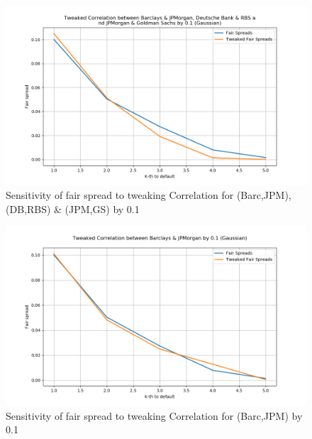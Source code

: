 \documentclass{report}
\theoremstyle{plain}
\theoremstyle{definition}
\begin{document}
\begin{figure}[H]
	\begin{center}
		\includegraphics[width=15cm]{Tweaked_Correlation_between_Barclays_&_JPMorgan,_Deutsche_Bank_&_RBS_and_JPMorgan_&_Goldman_Sachs_by_0,1_(Gaussian).png}
		\caption{Sensitivity of fair spread to tweaking Correlation for (Barc,JPM), (DB,RBS) \& (JPM,GS) by 0.1} 
		\label{Tweaked_Correlation_between_Barclays_&_JPMorgan,_Deutsche_Bank_&_RBS_and_JPMorgan_&_Goldman_Sachs_by_0.1_(Gaussian)}
	\end{center}
\end{figure}

\begin{figure}[H]
	\begin{center}
		\includegraphics[width=15cm]{Tweaked_Correlation_between_Barclays_&_JPMorgan_by_0,1_(Gaussian).png}
		\caption{Sensitivity of fair spread to tweaking Correlation for (Barc,JPM) by 0.1} 
		\label{Tweaked_Correlation_between_Barclays_&_JPMorgan_by_0.1_(Gaussian)}
	\end{center}
\end{figure}
\end{document}
